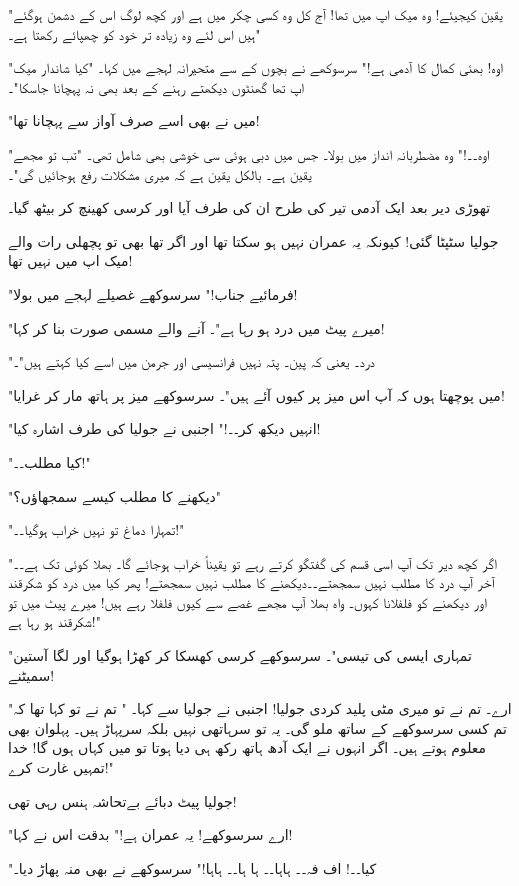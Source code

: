 "یقین کیجیئے! وہ میک اپ میں تھا! آج کل وہ کسی چکر میں ہے اور کچھ لوگ اس کے دشمن ہوگئے ہیں اس لئے وہ زیادہ تر خود کو چھپائے رکھتا ہے۔"

"اوہ! بھئی کمال کا آدمی ہے!" سرسوکھے نے بچوں کے سے متحیرانہ لہجے میں کہا۔ "کیا شاندار میک اپ تھا گھنٹوں دیکھتے رہنے کے بعد بھی نہ پہچانا جاسکا"۔

"میں نے بھی اسے صرف آواز سے پہچانا تھا!

"اوہ۔۔!" وہ مضطربانہ انداز میں بولا۔ جس میں دبی ہوئی سی خوشی بھی شامل تھی۔ "تب تو مجھے یقین ہے۔ بالکل یقین ہے کہ میری مشکلات رفع ہوجائیں گی"۔

تھوڑی دیر بعد ایک آدمی تیر کی طرح ان کی طرف آیا اور کرسی کھینچ کر بیٹھ گیا۔

جولیا سٹپٹا گئی! کیونکہ یہ عمران نہیں ہو سکتا تھا اور اگر تھا بھی تو پچھلی رات والے میک اپ میں نہیں تھا!

"فرمائیے جناب!" سرسوکھے غصیلے لہجے میں بولا!

"میرے پیٹ میں درد ہو رہا ہے"۔ آنے والے مسمی صورت بنا کر کہا!

"درد۔ یعنی کہ پین۔ پتہ نہیں فرانسیسی اور جرمن میں اسے کیا کہتے ہیں"۔

"میں پوچھتا ہوں کہ آپ اس میز پر کیوں آئے ہیں"۔ سرسوکھے میز پر ہاتھ مار کر غرایا!

"انہیں دیکھ کر۔۔!" اجنبی نے جولیا کی طرف اشارہ کیا!

"کیا مطلب۔۔!"

"دیکھنے کا مطلب کیسے سمجھاؤں؟"

"تمہارا دماغ تو نہیں خراب ہوگیا۔۔!"

"اگر کچھ دیر تک آپ اسی قسم کی گفتگو کرتے رہے تو یقیناً خراب ہوجائے گا۔ بھلا کوئی تک ہے۔۔ آخر آپ درد کا مطلب نہیں سمجھتے۔۔دیکھنے کا مطلب نہیں سمجھتے! پھر کیا میں درد کو شکرقند اور دیکھنے کو فلفلانا کہوں۔ واہ بھلا آپ مجھے غصے سے کیوں فلفلا رہے ہیں! میرے پیٹ میں تو شکرقند ہو رہا ہے!"

"تمہاری ایسی کی تیسی"۔ سرسوکھے کرسی کھسکا کر کھڑا ہوگیا اور لگا آستین سمیٹنے!

"ارے۔ تم نے تو میری مٹی پلید کردی جولیا! اجنبی نے جولیا سے کہا۔ " تم نے تو کہا تھا کہ تم کسی سرسوکھے کے ساتھ ملو گی۔ یہ تو سرہاتھی نہیں بلکہ سرپہاڑ ہیں۔ پہلوان بھی معلوم ہوتے ہیں۔ اگر انہوں نے ایک آدھ ہاتھ رکھ ہی دیا ہوتا تو میں کہاں ہوں گا! خدا تمہیں غارت کرے!"

جولیا پیٹ دبائے بےتحاشہ ہنس رہی تھی!

"ارے سرسوکھے! یہ عمران ہے!" بدقت اس نے کہا!

"کیا۔۔! اف فہ۔۔ ہاہا۔۔ ہا ہا۔۔ ہاہا!" سرسوکھے نے بھی منہ پھاڑ دیا۔

